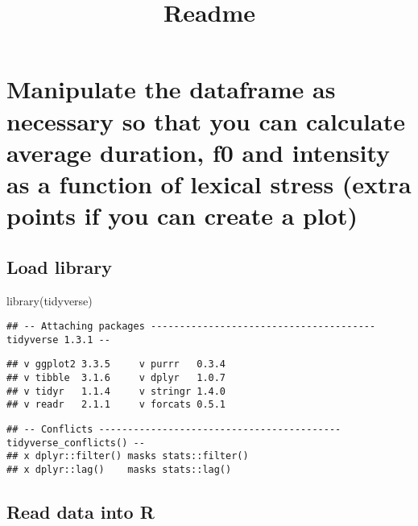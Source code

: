 \documentclass[
]{article}
\title{Readme}
\author{}
\date{\vspace{-2.5em}}
\newenvironment{Shaded}{\begin{snugshade}}{\end{snugshade}}
\newcommand{\FunctionTok}[1]{\textcolor[rgb]{0.00,0.00,0.00}{#1}}
\newcommand{\NormalTok}[1]{#1}
\begin{document}
\maketitle

\hypertarget{manipulate-the-dataframe-as-necessary-so-that-you-can-calculate-average-duration-f0-and-intensity-as-a-function-of-lexical-stress-extra-points-if-you-can-create-a-plot}{%
\section{Manipulate the dataframe as necessary so that you can calculate
average duration, f0 and intensity as a function of lexical stress
(extra points if you can create a
plot)}\label{manipulate-the-dataframe-as-necessary-so-that-you-can-calculate-average-duration-f0-and-intensity-as-a-function-of-lexical-stress-extra-points-if-you-can-create-a-plot}}

\hypertarget{load-library}{%
\subsection{Load library}\label{load-library}}

\begin{Shaded}
\begin{Highlighting}[]
\FunctionTok{library}\NormalTok{(tidyverse)}
\end{Highlighting}
\end{Shaded}

\begin{verbatim}
## -- Attaching packages --------------------------------------- tidyverse 1.3.1 --
\end{verbatim}

\begin{verbatim}
## v ggplot2 3.3.5     v purrr   0.3.4
## v tibble  3.1.6     v dplyr   1.0.7
## v tidyr   1.1.4     v stringr 1.4.0
## v readr   2.1.1     v forcats 0.5.1
\end{verbatim}

\begin{verbatim}
## -- Conflicts ------------------------------------------ tidyverse_conflicts() --
## x dplyr::filter() masks stats::filter()
## x dplyr::lag()    masks stats::lag()
\end{verbatim}

\hypertarget{read-data-into-r}{%
\subsection{Read data into R}\label{read-data-into-r}}
\end{document}
